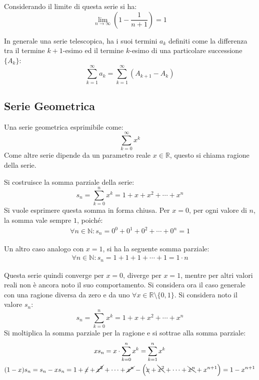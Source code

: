 \documentclass{article}
\numberwithin{equation}{subsection}
\begin{document}
Considerando il limite di questa serie si ha:
\begin{equation*}
    \lim_{n\to\infty}\left(1-\displaystyle\frac{1}{n+1}\right)=1
\end{equation*}

In generale una serie telescopica, ha i suoi termini $a_k$ definiti come la differenza tra il termine $k+1$-esimo ed il termine $k$-esimo di una particolare successione $\{A_k\}$:
\begin{equation}
    \displaystyle\sum_{k=1}^\infty a_k=\sum_{k=1}^\infty\left(A_{k+1}-A_{k}\right)
\end{equation} 

\subsection{Serie Geometrica}

Una serie geometrica esprimibile come:
\begin{equation}
    \displaystyle\sum_{k=0}^\infty x^k
\end{equation}
Come altre serie dipende da un parametro reale $x\in\mathbb{R}$, questo si chiama ragione della serie. 

Si costruisce la somma parziale della serie:
\begin{equation*}
    s_n=\displaystyle\sum_{k=0}^n x^k=1+x+x^2+\cdots+x^n    
\end{equation*}
Si vuole esprimere questa somma in forma chiusa. Per $x=0$, per ogni valore di $n$, la somma vale sempre $1$, poiché:
\begin{gather*}
    \forall n\in\mathbb{N}: s_n=0^0+0^1+0^2+\cdots+0^n=1
\end{gather*}

Un altro caso analogo con $x=1$, si ha la seguente somma parziale:
\begin{gather*}
    \forall n\in\mathbb{N}: s_n=1+1+1+\cdots+1=1\cdot n
\end{gather*}

Questa serie quindi converge per $x=0$, diverge per $x=1$, mentre per altri valori reali non è ancora noto il suo comportamento. 
Si considera ora il caso generale con una ragione diversa da zero e da uno $\forall x\in\mathbb{R}\setminus\{0,1\}$. 
Si considera noto il valore $s_n$:
\begin{equation*}
    s_n=\displaystyle\sum_{k=0}^n x^k=1+x+x^2+\cdots+x^n    
\end{equation*}
Si moltiplica la somma parziale per la ragione e si sottrae alla somma parziale:
\begin{gather*}
    xs_n=x\cdot\displaystyle\sum_{k=0}^n x^k=\sum_{k=1}^nx^k\\
    (1-x)s_n=s_n-xs_n=1+\cancel{x}+\cancel{x^2}+\cdots+\cancel{x^n}-\left(\bcancel{x}+\bcancel{x^2}+\cdots+\bcancel{x^n}+x^{n+1}\right)=1-x^{n+1}
\end{gather*}
\end{document}
